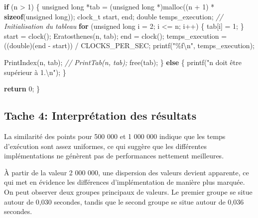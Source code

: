 \documentclass[
]{article}
\newenvironment{Shaded}{}{}
\newcommand{\CommentTok}[1]{\textcolor[rgb]{0.38,0.63,0.69}{\textit{#1}}}
\newcommand{\ControlFlowTok}[1]{\textcolor[rgb]{0.00,0.44,0.13}{\textbf{#1}}}
\newcommand{\DataTypeTok}[1]{\textcolor[rgb]{0.56,0.13,0.00}{#1}}
\newcommand{\DecValTok}[1]{\textcolor[rgb]{0.25,0.63,0.44}{#1}}
\newcommand{\KeywordTok}[1]{\textcolor[rgb]{0.00,0.44,0.13}{\textbf{#1}}}
\newcommand{\NormalTok}[1]{#1}
\newcommand{\SpecialCharTok}[1]{\textcolor[rgb]{0.25,0.44,0.63}{#1}}
\newcommand{\StringTok}[1]{\textcolor[rgb]{0.25,0.44,0.63}{#1}}
\begin{document}
\begin{Shaded}
\begin{Highlighting}[]
    \ControlFlowTok{if}\NormalTok{ (n \textgreater{} }\DecValTok{1}\NormalTok{)}
\NormalTok{    \{}
        \DataTypeTok{unsigned} \DataTypeTok{long}\NormalTok{ *tab = (}\DataTypeTok{unsigned} \DataTypeTok{long}\NormalTok{ *)malloc((n + }\DecValTok{1}\NormalTok{) * }\KeywordTok{sizeof}\NormalTok{(}\DataTypeTok{unsigned} \DataTypeTok{long}\NormalTok{));}
\NormalTok{        clock\_t start, end;}
        \DataTypeTok{double}\NormalTok{ temps\_execution;}
        \CommentTok{// Initialisation du tableau}
        \ControlFlowTok{for}\NormalTok{ (}\DataTypeTok{unsigned} \DataTypeTok{long}\NormalTok{ i = }\DecValTok{2}\NormalTok{; i \textless{}= n; i++)}
\NormalTok{        \{}
\NormalTok{            tab[i] = }\DecValTok{1}\NormalTok{;}
\NormalTok{        \}}
\NormalTok{        start = clock();}
\NormalTok{        Eratosthenes(n, tab);}
\NormalTok{        end = clock();}
\NormalTok{        temps\_execution = ((}\DataTypeTok{double}\NormalTok{)(end {-} start)) / CLOCKS\_PER\_SEC;}
\NormalTok{        printf(}\StringTok{"\%f}\SpecialCharTok{\textbackslash{}n}\StringTok{"}\NormalTok{, temps\_execution);}

\NormalTok{        PrintIndex(n, tab);}
        \CommentTok{// PrintTab(n, tab);}
\NormalTok{        free(tab);}
\NormalTok{    \}}
    \ControlFlowTok{else}
\NormalTok{    \{}
\NormalTok{        printf(}\StringTok{"n doit être supérieur à 1.}\SpecialCharTok{\textbackslash{}n}\StringTok{"}\NormalTok{);}
\NormalTok{    \}}

    \ControlFlowTok{return} \DecValTok{0}\NormalTok{;}
\NormalTok{\}}
\end{Highlighting}
\end{Shaded}

\hypertarget{tache-4-interpruxe9tation-des-ruxe9sultats}{%
\subsection{Tache 4: Interprétation des
résultats}\label{tache-4-interpruxe9tation-des-ruxe9sultats}}

La similarité des points pour 500 000 et 1 000 000 indique que les temps
d'exécution sont assez uniformes, ce qui suggère que les différentes
implémentations ne génèrent pas de performances nettement meilleures.

À partir de la valeur 2 000 000, une dispersion des valeurs devient
apparente, ce qui met en évidence les différences d'implémentation de
manière plus marquée. On peut observer deux groupes principaux de
valeurs. Le premier groupe se situe autour de 0,030 secondes, tandis que
le second groupe se situe autour de 0,036 secondes.
\end{document}
